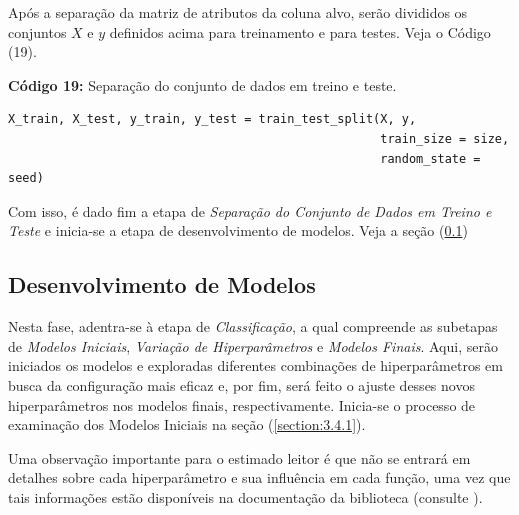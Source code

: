 \documentclass[a4paper,12pt]{article} %
\begin{document}
Após a separação da matriz de atributos da coluna alvo, serão divididos os conjuntos $X$ e $y$ definidos acima para treinamento e para testes.  Veja o Código (19).

\begin{center}
\textbf{Código 19:} Separação do conjunto de dados em treino e teste.
\begin{verbatim}
X_train, X_test, y_train, y_test = train_test_split(X, y,
                                                    train_size = size,
                                                    random_state = seed)
\end{verbatim}
\end{center}

Com isso, é dado fim a etapa de \textit{Separação do Conjunto de Dados em Treino e Teste} e inicia-se a etapa de desenvolvimento de modelos. Veja a seção (\ref{section:3.4})

\subsection{Desenvolvimento de Modelos} \label{section:3.4}
Nesta fase, adentra-se à etapa de \textit{Classificação}, a qual compreende as subetapas de \textit{Modelos Iniciais}, \textit{Variação de Hiperparâmetros} e \textit{Modelos Finais}. Aqui, serão iniciados os modelos e exploradas diferentes combinações de hiperparâmetros em busca da configuração mais eficaz e, por fim, será feito o ajuste desses novos hiperparâmetros nos modelos finais, respectivamente. Inicia-se o processo de examinação dos Modelos Iniciais na seção (\ref{section:3.4.1}).

Uma observação importante para o estimado leitor é que não se entrará em detalhes sobre cada hiperparâmetro e sua influência em cada função, uma vez que tais informações estão disponíveis na documentação da biblioteca (consulte \cite{sklearn}).
\end{document}
